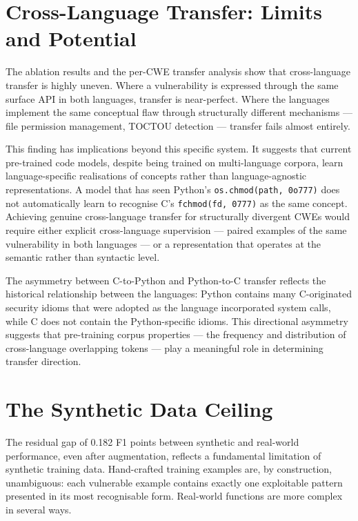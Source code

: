 \section{Cross-Language Transfer: Limits and Potential}

The ablation results and the per-CWE transfer analysis show that cross-language transfer
is highly uneven.
Where a vulnerability is expressed through the same surface API in both languages,
transfer is near-perfect.
Where the languages implement the same conceptual flaw through structurally different
mechanisms --- file permission management, TOCTOU detection --- transfer fails almost
entirely.

This finding has implications beyond this specific system.
It suggests that current pre-trained code models, despite being trained on multi-language
corpora, learn language-specific realisations of concepts rather than language-agnostic
representations.
A model that has seen Python's \texttt{os.chmod(path, 0o777)} does not automatically
learn to recognise C's \texttt{fchmod(fd, 0777)} as the same concept.
Achieving genuine cross-language transfer for structurally divergent CWEs would require
either explicit cross-language supervision --- paired examples of the same vulnerability
in both languages --- or a representation that operates at the semantic rather than
syntactic level.

The asymmetry between C-to-Python and Python-to-C transfer reflects the historical
relationship between the languages: Python contains many C-originated security idioms that
were adopted as the language incorporated system calls, while C does not contain the
Python-specific idioms.
This directional asymmetry suggests that pre-training corpus properties --- the frequency
and distribution of cross-language overlapping tokens --- play a meaningful role in
determining transfer direction.

\section{The Synthetic Data Ceiling}

The residual gap of 0.182 F1 points between synthetic and real-world performance, even
after augmentation, reflects a fundamental limitation of synthetic training data.
Hand-crafted training examples are, by construction, unambiguous: each vulnerable example
contains exactly one exploitable pattern presented in its most recognisable form.
Real-world functions are more complex in several ways.

